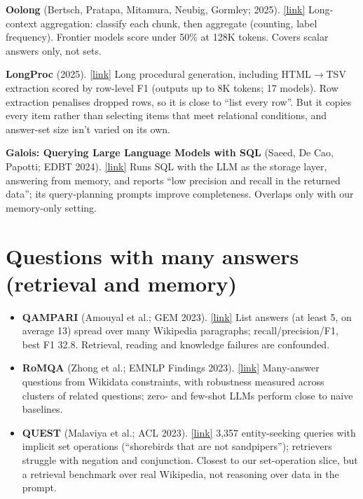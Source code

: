 \documentclass[10pt]{article}
\newcommand{\paper}[3]{\textbf{#1} \textnormal{(#2)}. \href{#3}{\small[link]}}
\begin{document}
\paper{Oolong}{Bertsch, Pratapa, Mitamura, Neubig, Gormley; 2025}{https://arxiv.org/abs/2511.02817}
Long-context aggregation: classify each chunk, then aggregate (counting, label frequency). Frontier models score
under 50\% at 128K tokens. Covers scalar answers only, not sets.

\paper{LongProc}{2025}{https://arxiv.org/abs/2501.05414}
Long procedural generation, including HTML$\to$TSV extraction scored by row-level F1 (outputs up to 8K tokens; 17
models). Row extraction penalises dropped rows, so it is close to ``list every row''. But it copies every item
rather than selecting items that meet relational conditions, and answer-set size isn't varied on its own.

\paper{Galois: Querying Large Language Models with SQL}{Saeed, De Cao, Papotti; EDBT 2024}{https://arxiv.org/abs/2304.00472}
Runs SQL with the LLM as the storage layer, answering from memory, and reports ``low precision and recall in the
returned data''; its query-planning prompts improve completeness. Overlaps only with our memory-only setting.

\section*{Questions with many answers (retrieval and memory)}
\begin{itemize}
\item \paper{QAMPARI}{Amouyal et al.; GEM 2023}{https://arxiv.org/abs/2205.12665}
List answers (at least 5, on average 13) spread over many Wikipedia paragraphs; recall/precision/F1, best F1 32.8.
Retrieval, reading and knowledge failures are confounded.
\item \paper{RoMQA}{Zhong et al.; EMNLP Findings 2023}{https://arxiv.org/abs/2210.14353}
Many-answer questions from Wikidata constraints, with robustness measured across clusters of related questions;
zero- and few-shot LLMs perform close to naive baselines.
\item \paper{QUEST}{Malaviya et al.; ACL 2023}{https://arxiv.org/abs/2305.11694}
3,357 entity-seeking queries with implicit set operations (``shorebirds that are not sandpipers''); retrievers
struggle with negation and conjunction. Closest to our set-operation slice, but a retrieval benchmark over real
Wikipedia, not reasoning over data in the prompt.
\end{itemize}
\end{document}
